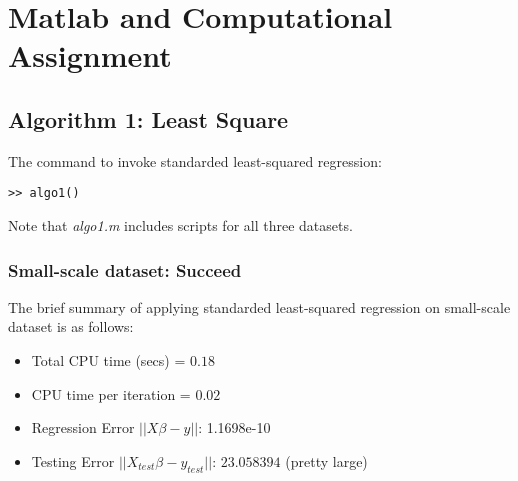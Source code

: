 \documentclass[11pt,a4paper]{report}
\begin{document}
\begin{titlepage}
    \maketitle
\end{titlepage}
\renewcommand{\contentsname}{Table of Contents}
\begin{center} 
    \tableofcontents 
\end{center}
\newpage

\chapter{Matlab and Computational Assignment}
\section{Algorithm 1: Least Square}
The command to invoke standarded least-squared regression:
\begin{verbatim}
>> algo1()
\end{verbatim}
Note that {\it algo1.m} includes scripts for all three datasets.
\subsection{Small-scale dataset: Succeed}
The brief summary of applying standarded least-squared regression on
small-scale dataset is as follows:
\begin{itemize}
    \item  Total CPU time (secs)  = $0.18$  

    \item   CPU time per iteration = $0.02$

    \item   Regression Error $||X \beta - y||$: 1.1698e-10
    
    \item Testing Error $||X_{test} \beta - y_{test}||$: $23.058394$ (pretty large)
\end{itemize}
\end{document}
